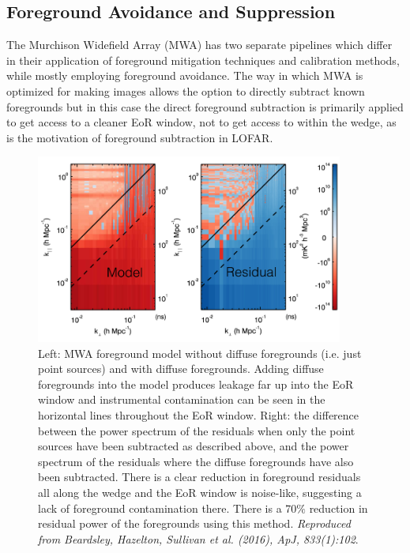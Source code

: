 \subsection{Foreground Avoidance and Suppression}

The Murchison Widefield Array (MWA) has two separate pipelines which differ in their application of foreground mitigation techniques and calibration methods, while mostly employing foreground avoidance. The way in which MWA is optimized for making images allows the option to directly subtract known foregrounds but in this case the direct foreground subtraction is primarily applied to get access to a cleaner EoR window, not to get access to within the wedge, as is the motivation of foreground subtraction in LOFAR.

\begin{figure}
\begin{center}
    \includegraphics[width=0.9\textwidth]{Chapman_Jelic/Images/apjaa3b64f9_hr.png}
\end{center}
\caption{Left: MWA foreground model without diffuse foregrounds (i.e. just point sources) and with diffuse foregrounds. Adding diffuse foregrounds into the model produces leakage far up into the EoR window and instrumental contamination can be seen in the horizontal lines throughout the EoR window. Right: the difference between the power spectrum of the residuals when only the point sources have been subtracted as described above, and the power spectrum of the residuals where the diffuse foregrounds have also been subtracted. There is a clear reduction in foreground residuals all along the wedge and the EoR window is noise-like, suggesting a lack of foreground contamination there. There is a 70$\%$ reduction in residual power of the foregrounds using this method. \textit{Reproduced from Beardsley, Hazelton, Sullivan et al. (2016), ApJ, 833(1):102}.}
    \label{fig:beardsley_fg_sub}
\end{figure}

